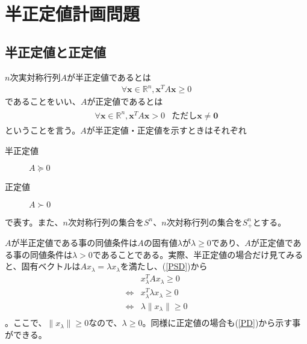 
\section{半正定値計画問題}
\subsection{半正定値と正定値}
$n$次実対称行列$A$が半正定値であるとは
\begin{align} \label{PSD}
  \forall \mathbf{x} \in \mathbb{R}^n, \mathbf{x}^T A \mathbf{x} \geq 0
\end{align}
であることをいい、$A$が正定値であるとは
\begin{align} \label{PD}
  \begin{array}{ll}
    \forall \mathbf{x} \in \mathbb{R}^n, \mathbf{x}^T A \mathbf{x} > 0 & \text{ただし}\mathbf{x} \not = \mathbf{0}
  \end{array}
\end{align}
ということを言う。$A$が半正定値・正定値を示すときはそれぞれ
\begin{description}
  \item[半正定値] $A \succeq 0$
  \item[正定値]   $A \succ 0$
\end{description}
で表す。また、$n$次対称行列の集合を$S^n$、$n$次対称行列の集合を$S_+^n$とする。

$A$が半正定値である事の同値条件は$A$の固有値$\lambda$が$\lambda \geq 0$であり、$A$が正定値である事の同値条件は$\lambda > 0$であることである。実際、半正定値の場合だけ見てみると、固有ベクトルは$A x_\lambda = \lambda x_\lambda$を満たし、(\ref{PSD})から
\begin{align*}
                  & x_\lambda^T A x_\lambda \geq 0 \\
  \Leftrightarrow & x_\lambda^T \lambda x_\lambda \geq 0 \\
  \Leftrightarrow & \lambda \|x_\lambda\| \geq 0 \\
\end{align*}
。ここで、$\|x_\lambda\| \geq 0$なので、$\lambda \geq 0$。同様に正定値の場合も(\ref{PD})から示す事ができる。

